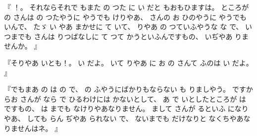 %
『
！。
%
それならそれで
もまた
の
つた
に
い
だと
もおもひますは。
%
ところが
の
さんは
の
つたやうに
やうでも
けりやあ、
%
さんの
お
ひのやうに
やうでも
いんで、
%
たゞ
い
やあ
まかせに
て
いて、
%
りやあ
の
つていふやうな
な
で、
%
いつまでも
さんは
りつばなしに
て
つて
かうといふんですもの、
%
いぢやあ
りませんか。
』

%
『そりやあ
いとも！。
%
い
だよ。
%
いて
りやあ
に
お
の
さんて
ふのは
い
だよ。
』

%
『でもまあ
の
は
の
で、
%
の
ふやうにばかりもならない
も
りましやう。
%
ですからお
さんが
なら
で
ひるわけには
かないとして、
%
あ
で
いとしたところが
は
ですもの、
%
は
までも
なけりやあなりません。
%
まして
さんが
るといふ
になりやあ、
%
しても
らん
ぢやあ
られない
で、
%
ないまでも
だけなりと
なくちやあなりませんはネ。
』

